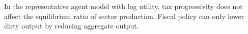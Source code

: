 	\begin{comment}
	To see this write:
\begin{align}
	\frac{d\left(\frac{Y_d}{Y_c}\right)}{d \tau_l}=\frac{Y_d}{Y_c}\left(\frac{\frac{dY_d}{Y_d}}{d \tau_l}-\frac{\frac{dY_c}{Y_c}}{d \tau_l}\right)=0
\end{align}
and observe that the percentage change in sector output is homogeneous. 
\begin{align}
	\frac{1}{Y_d}\frac{dY_d}{d \tau_l}= \frac{1}{L_d}\frac{d L_d}{d \tau_l}=\frac{1}{H}\frac{d H}{d \tau_l}\ \text{and} \ \frac{1}{Y_c}\frac{dY_c}{d \tau_l}= \frac{1}{L_c}\frac{d L_c}{d \tau_l}=\frac{1}{H}\frac{d H}{d \tau_l}.
\end{align}
\textbf{}
content...
\end{comment}






\begin{prop}
	In the representative agent model with log utility, tax progressivity does not affect the equilibrium ratio of sector production. Fiscal policy can only lower dirty output by reducing aggregate output.
\end{prop}

